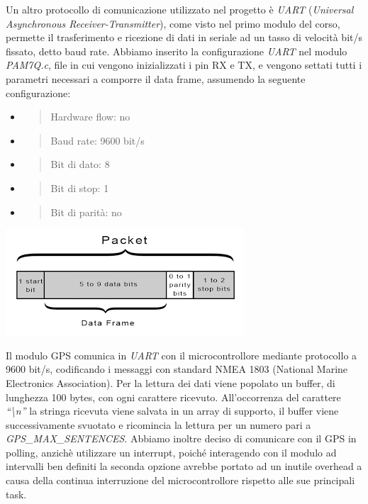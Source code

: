 Un altro protocollo di comunicazione utilizzato nel progetto è
\emph{UART} (\emph{Universal Asynchronous Receiver-Transmitter}), come
visto nel primo modulo del corso, permette il trasferimento e ricezione
di dati in seriale ad un tasso di velocità bit/s fissato, detto baud
rate. Abbiamo inserito la configurazione \emph{UART} nel modulo
\emph{PAM7Q.c}, file in cui vengono inizializzati i pin RX e TX, e
vengono settati tutti i parametri necessari a comporre il data frame,
assumendo la seguente configurazione:

\begin{itemize}
\item
  \begin{quote}
  Hardware flow: no
  \end{quote}
\item
  \begin{quote}
  Baud rate: 9600 bit/s
  \end{quote}
\item
  \begin{quote}
  Bit di dato: 8
  \end{quote}
\item
  \begin{quote}
  Bit di stop: 1
  \end{quote}
\item
  \begin{quote}
  Bit di parità: no
  \end{quote}
\end{itemize}

\begin{center}
\includegraphics[width=3.5in,height=1.5625in]{figures/image46.png}
\captionsetup{type=figure}
\end{center}

Il modulo GPS comunica in \emph{UART} con il microcontrollore mediante
protocollo a 9600 bit/s, codificando i messaggi con standard NMEA 1803
(National Marine Electronics Association). Per la lettura dei dati viene
popolato un buffer, di lunghezza 100 bytes, con ogni carattere ricevuto.
All'occorrenza del carattere \emph{``\textbackslash n''} la stringa
ricevuta viene salvata in un array di supporto, il buffer viene
successivamente svuotato e ricomincia la lettura per un numero pari a
\emph{GPS\_MAX\_SENTENCES}. Abbiamo inoltre deciso di comunicare con il
GPS in polling, anzichè utilizzare un interrupt, poiché interagendo con
il modulo ad intervalli ben definiti la seconda opzione avrebbe portato
ad un inutile overhead a causa della continua interruzione del
microcontrollore rispetto alle sue principali task.

